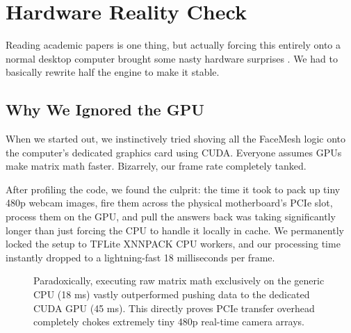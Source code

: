 \documentclass[conference]{IEEEtran}
\begin{document}

\section{Hardware Reality Check}

Reading academic papers is one thing, but actually forcing this entirely onto a normal desktop computer brought some nasty hardware surprises \cite{b3}. We had to basically rewrite half the engine to make it stable.

\subsection{Why We Ignored the GPU}
When we started out, we instinctively tried shoving all the FaceMesh logic onto the computer's dedicated graphics card using CUDA. Everyone assumes GPUs make matrix math faster. Bizarrely, our frame rate completely tanked.

After profiling the code, we found the culprit: the time it took to pack up tiny 480p webcam images, fire them across the physical motherboard's PCIe slot, process them on the GPU, and pull the answers back was taking significantly longer than just forcing the CPU to handle it locally in cache. We permanently locked the setup to TFLite XNNPACK CPU workers, and our processing time instantly dropped to a lightning-fast 18 milliseconds per frame.

\begin{figure}[htbp]
\centering
{}
\caption{Paradoxically, executing raw matrix math exclusively on the generic CPU (18 ms) vastly outperformed pushing data to the dedicated CUDA GPU (45 ms). This directly proves PCIe transfer overhead completely chokes extremely tiny 480p real-time camera arrays.}
\end{figure}
\end{document}
